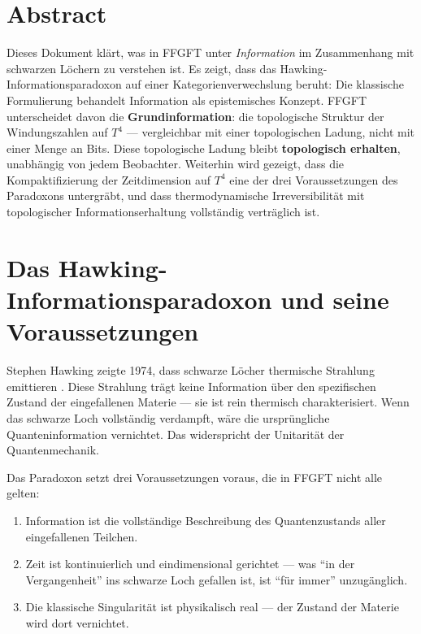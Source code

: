 
\section*{Abstract}

Dieses Dokument klärt, was in FFGFT unter \emph{Information} im Zusammenhang mit schwarzen Löchern zu verstehen ist. Es zeigt, dass das Hawking-Informationsparadoxon auf einer Kategorienverwechslung beruht: Die klassische Formulierung behandelt Information als epistemisches Konzept. FFGFT unterscheidet davon die \textbf{Grundinformation}: die topologische Struktur der Windungszahlen auf $T^4$ --- vergleichbar mit einer topologischen Ladung, nicht mit einer Menge an Bits. Diese topologische Ladung bleibt \textbf{topologisch erhalten}, unabhängig von jedem Beobachter. Weiterhin wird gezeigt, dass die Kompaktifizierung der Zeitdimension auf $T^4$ eine der drei Voraussetzungen des Paradoxons untergräbt, und dass thermodynamische Irreversibilität mit topologischer Informationserhaltung vollständig verträglich ist.

\tableofcontents
\newpage

\section{Das Hawking-Informationsparadoxon und seine Voraussetzungen}

Stephen Hawking zeigte 1974, dass schwarze Löcher thermische Strahlung emittieren \cite{Hawking1974}. Diese Strahlung trägt keine Information über den spezifischen Zustand der eingefallenen Materie --- sie ist rein thermisch charakterisiert. Wenn das schwarze Loch vollständig verdampft, wäre die ursprüngliche Quanteninformation vernichtet. Das widerspricht der Unitarität der Quantenmechanik.

Das Paradoxon setzt drei Voraussetzungen voraus, die in FFGFT nicht alle gelten:

\begin{enumerate}
  \item Information ist die vollständige Beschreibung des Quantenzustands aller eingefallenen Teilchen.
  \item Zeit ist kontinuierlich und eindimensional gerichtet --- was ``in der Vergangenheit'' ins schwarze Loch gefallen ist, ist ``für immer'' unzugänglich.
  \item Die klassische Singularität ist physikalisch real --- der Zustand der Materie wird dort vernichtet.
\end{enumerate}

